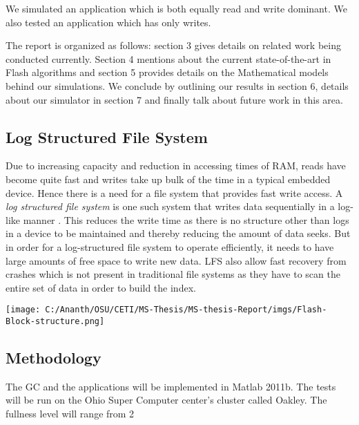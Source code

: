 We simulated an application which is both equally read and write dominant. We also tested an application which has only writes.

The report is organized as follows: section 3 gives details on related work being conducted currently. Section 4 mentions about the current state-of-the-art in Flash algorithms and section 5 provides details on the Mathematical models behind our simulations. We conclude by outlining our results in section 6, details about our simulator in section 7 and finally talk about future work in this area.

\subsection{Log Structured File System}
	Due to increasing capacity and reduction in accessing times of RAM, reads have become quite fast and writes take up bulk of the time in a typical embedded device. Hence there is a need for a file system that provides fast write access. A \emph{log structured file system} is one such system that writes data sequentially in a log-like manner \cite{Rosenblum91}. This reduces the write time as there is no structure other than logs in a device to be maintained and thereby reducing the amount of data seeks. But in order for a log-structured file system to operate efficiently, it needs to have large amounts of free space to write new data. LFS also allow fast recovery from crashes which is not present in traditional file systems as they have to scan the entire set of data in order to build the index.

\begin{SCfigure}
	\centering
	\texttt{[image: C:/Ananth/OSU/CETI/MS-Thesis/MS-thesis-Report/imgs/Flash-Block-structure.png]}
\end{SCfigure}


\subsection{Methodology}
The GC and the applications will be implemented in Matlab 2011b. The tests will be run on the Ohio Super Computer center’s cluster called Oakley. The fullness level will range from 2%

